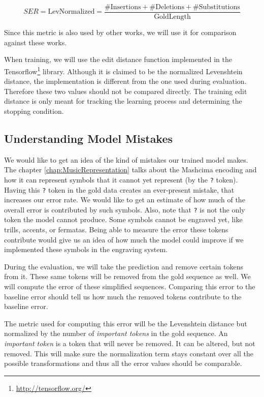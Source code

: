 $$
SER = \text{LevNormalized} = \frac{\#\text{Insertions} + \#\text{Deletions} + \#\text{Substitutions}}{\text{GoldLength}}
$$

Since this metric is also used by other works, we will use it for comparison against these works.

When training, we will use the edit distance function implemented in the Tensorflow\footnote{\href{http://tensorflow.org/}{http://tensorflow.org/}} library. Although it is claimed to be the normalized Levenshtein distance, the implementation is different from the one used during evaluation. Therefore these two values should not be compared directly. The training edit distance is only meant for tracking the learning process and determining the stopping condition.


\subsection{Understanding Model Mistakes}
\label{sec:UnderstandingModelMistakes}

We would like to get an idea of the kind of mistakes our trained model makes. The chapter \ref{chap:MusicRepresentation} talks about the Mashcima encoding and how it can represent symbols that it cannot yet represent (by the \verb`?` token). Having this \verb`?` token in the gold data creates an ever-present mistake, that increases our error rate. We would like to get an estimate of how much of the overall error is contributed by such symbols. Also, note that \verb`?` is not the only token the model cannot produce. Some symbols cannot be engraved yet, like trills, accents, or fermatas. Being able to measure the error these tokens contribute would give us an idea of how much the model could improve if we implemented these symbols in the engraving system.

During the evaluation, we will take the prediction and remove certain tokens from it. These same tokens will be removed from the gold sequence as well. We will compute the error of these simplified sequences. Comparing this error to the baseline error should tell us how much the removed tokens contribute to the baseline error.

The metric used for computing this error will be the Levenshtein distance but normalized by the number of \emph{important tokens} in the gold sequence. An \emph{important token} is a token that will never be removed. It can be altered, but not removed. This will make sure the normalization term stays constant over all the possible transformations and thus all the error values should be comparable.

